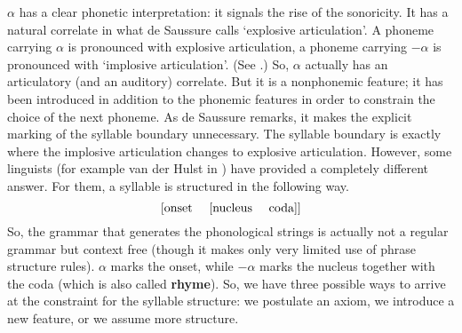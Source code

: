 $\alpha$ has a clear phonetic interpretation: it signals the rise
of the sonoricity. It has a natural correlate in what de
Saussure calls `explosive articulation'. A phoneme carrying
$\alpha$ is pronounced with explosive articulation, a phoneme carrying
$-\alpha$ is pronounced with `implosive articulation'. (See 
\cite{desaussure:grundfragen}.) So, $\alpha$ actually has
an articulatory (and an auditory) correlate. But it is a nonphonemic
feature; it has been introduced in addition to the phonemic features
in order to constrain the choice of the next phoneme. As de Saussure
remarks, it makes the explicit marking of the syllable boundary
unnecessary. The syllable boundary is exactly where the implosive
articulation changes to explosive articulation. However, some linguists
(for example van der Hulst in ) 
have provided a
completely different answer. For them, a syllable is structured in
the following way.
\begin{equation}
\mbox{[onset \quad [nucleus \quad coda]]}
\end{equation}
So, the grammar that generates the phonological strings is actually
not a regular grammar but context free (though it makes only very
limited use of phrase structure rules). $\alpha$ marks the onset,
while $- \alpha$ marks the nucleus together with the coda (which is
also called \textbf{rhyme}). So, we have three possible ways to arrive
at the constraint for the syllable structure: we postulate an
axiom, we introduce a new feature, or we assume more structure.

